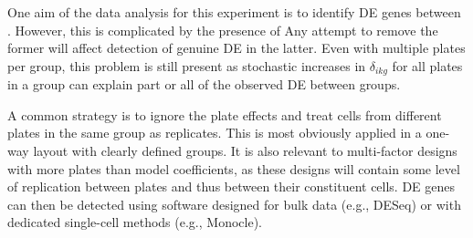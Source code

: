 \documentclass[oupdraft]{bio}
\begin{document}
One  aim of the data analysis for this experiment is to identify DE genes between .
However, this is complicated by the presence of 
Any attempt to remove the former will affect detection of genuine DE in the latter.
Even with multiple plates per group, this problem is still present as stochastic increases in $\delta_{ikg}$ for all plates in a group can explain part or all of the observed DE between groups.

A common strategy is to ignore the plate effects and treat cells from different plates in the same group as replicates.
This is most obviously applied in a one-way layout with clearly defined groups.
It is also relevant to multi-factor designs with more plates than model coefficients, as these designs will contain some level of replication between plates and thus between their constituent cells.
DE genes can then be detected using software designed for bulk data (e.g., DESeq) or with dedicated single-cell methods (e.g., Monocle).
\end{document}
